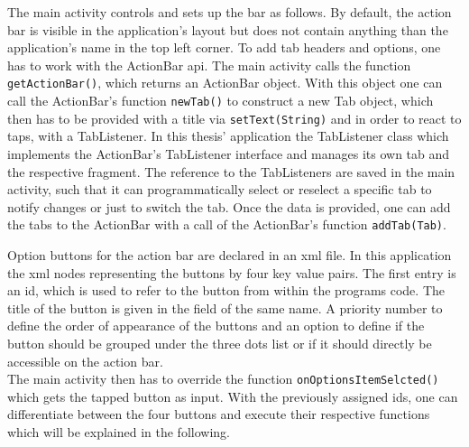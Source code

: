 The  main activity controls and sets up the bar as follows. By default, the action bar is visible in the application's layout but does not contain anything than the application's name in the top left corner. To add tab headers and options, one has to work with the ActionBar api. The main activity calls the function \lstinline$getActionBar()$, which returns an ActionBar object. With this object one can call the ActionBar's function \lstinline$newTab()$ to construct a new Tab object, which then has to be provided with a title via \lstinline$setText(String)$ and in order to react to taps, with a TabListener. In this thesis' application the TabListener class which implements the ActionBar's TabListener interface and manages its own tab and the respective fragment. The reference to the TabListeners are saved in the main activity, such that it can programmatically select or reselect a specific tab to notify changes or just to switch the tab. Once the data is provided, one can add the tabs to the ActionBar with a call of the ActionBar's function \lstinline$addTab(Tab)$.

Option buttons  for the action bar are declared in an xml file. In this application the xml nodes representing the buttons by four key value pairs.
The first entry is an id, which is used to refer to the button from within the programs code. The title of the button is given in the field of the same name. A priority number to define the order of appearance of the buttons and an option to define if the button should be grouped under the three dots list or if it should directly be accessible on the action bar.\\
The main activity then has to override the function \lstinline$onOptionsItemSelcted()$ which gets the tapped button as input. With the previously assigned ids, one can differentiate between the four buttons and execute their respective functions which will be explained in the following.

